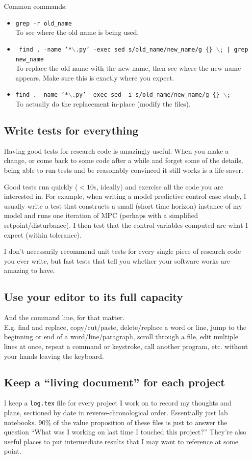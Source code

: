 \documentclass{article}
\begin{document}
Common commands:
\begin{itemize}
  \item \texttt{grep -r old\_name}\\
    To see where the old name is being used.
  \item \texttt{\small
      find . -name '*$\backslash$.py' -exec sed s/old\_name/new\_name/g \{\} $\backslash$; | grep new\_name
    }\\
    To replace the old name with the new name, then see where the new name appears.
    Make sure this is exactly where you expect.
  \item \texttt{find . -name '*$\backslash$.py' -exec sed -i s/old\_name/new\_name/g \{\} $\backslash$;
    }\\
    To actually do the replacement in-place (modify the files).
\end{itemize}

\subsection{Write tests for everything}
Having good tests for research code is amazingly useful.
When you make a change, or come back to some code after a while
and forget some of the details, being able to run tests and be reasonably
convinced it still works is a life-saver.

Good tests run quickly ($< 10$s, ideally) and exercise all the code you
are interested in. For example, when writing a model predictive control case
study, I usually write a test that constructs a small (short time horizon)
instance of my model and runs one iteration of MPC (perhaps with a simplified
setpoint/disturbance). I then test that the control variables computed are
what I expect (within tolerance).

I don't necessarily recommend unit tests for every single piece of research
code you ever write, but fast tests that tell you whether your software
works are amazing to have.

\subsection{Use your editor to its full capacity}
And the command line, for that matter.\\

E.g. find and replace, copy/cut/paste, delete/replace a word or line,
jump to the beginning or end of a word/line/paragraph, scroll through a file,
edit multiple lines at once, repeat a command or keystroke, call another
program, etc. without your hands leaving the keyboard.

\subsection{Keep a ``living document'' for each project}
I keep a \texttt{log.tex} file for every project I work on to record
my thoughts and plans, sectioned by date in reverse-chronological order.
Essentially just lab notebooks.
90\% of the value proposition of these files is just to answer the question
``What was I working on last time I touched this project?''
They're also useful places to put intermediate results that I may want to
reference at some point.
\end{document}
